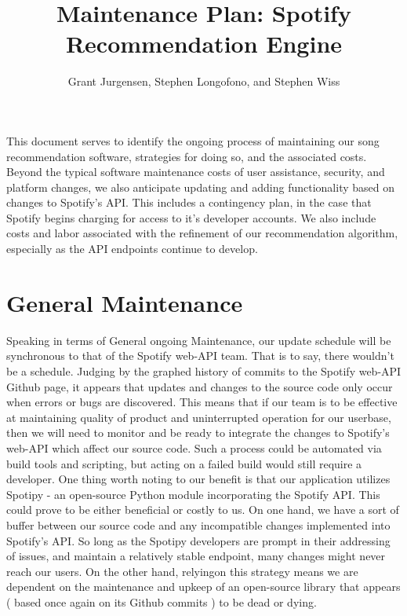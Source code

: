 \documentclass{roffin}
\begin{document}
\title{Maintenance Plan: Spotify Recommendation Engine}

\author{Grant Jurgensen, Stephen Longofono, and Stephen Wiss}

\maketitle
This document serves to identify the ongoing process of maintaining our song recommendation software, strategies for doing so, and the associated costs.  Beyond the typical software maintenance costs of user assistance, security, and platform changes, we also anticipate updating and adding functionality based on changes to Spotify's API. This includes a contingency plan, in the case that Spotify begins charging for access to it's developer  accounts.  We also include costs and labor associated with the refinement of our recommendation algorithm, especially as the API endpoints continue to develop.


\section{General Maintenance}


Speaking in terms of General ongoing Maintenance, our update schedule will be synchronous to that of the Spotify web-API team. That is to say, there wouldn't be a schedule. Judging by the graphed history of commits to the Spotify web-API Github page, it appears that updates and changes to the source code only occur when errors or bugs are discovered. This means that if our team is to be effective at maintaining quality of product and uninterrupted operation for our userbase, then we will need to monitor and be ready to integrate the changes to Spotify's web-API which affect our source code.  Such a process could be automated via build tools and scripting, but acting on a failed build would still require a developer.  One thing worth noting to our benefit is that our application utilizes Spotipy - an open-source Python module incorporating the Spotify API. This could prove to be either beneficial or costly to us. On one hand, we have a sort of buffer between our source code and any incompatible changes implemented into Spotify's API.  So long as the Spotipy developers are prompt in their addressing of issues, and maintain a relatively stable endpoint, many changes might never reach our users.  On the other hand, relyingon this strategy means we are dependent on the maintenance and upkeep of an open-source library that appears ( based once again on its Github commits ) to be dead or dying. 
\end{document}

